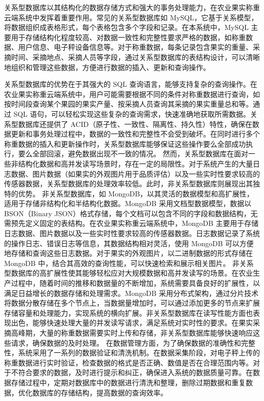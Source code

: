 \documentclass{xduugthesis}
\begin{document}
关系型数据库以其结构化的数据存储方式和强大的事务处理能力，在农业果实称重云端系统中发挥着重要作用。常见的关系型数据库如 MySQL，它基于关系模型，将数据组织成表格形式，每个表格包含多个字段和记录。在本系统中，MySQL 主要用于存储结构化程度较高、对数据一致性和完整性要求严格的数据，如称重数据、用户信息、电子秤设备信息等。对于称重数据，每条记录包含果实的重量、采摘时间、采摘地点、采摘人员等字段，通过关系型数据库的表结构设计，可以清晰地组织和管理这些数据，方便进行数据的插入、更新和查询操作。

关系型数据库的优势在于其强大的 SQL 查询语言，能够支持复杂的查询操作。在农业果实称重云端系统中，用户可能需要根据不同的条件对称重数据进行查询，如按时间段查询某个果园的果实产量、按采摘人员查询其采摘的果实重量总和等。通过 SQL 语句，可以轻松实现这些复杂的查询需求，快速准确地获取所需数据。关系型数据库还提供了 ACID（原子性、一致性、隔离性、持久性）特性，确保在数据更新和事务处理过程中，数据的一致性和完整性不会受到破坏。在同时进行多个称重数据的插入和更新操作时，关系型数据库能够保证这些操作要么全部成功执行，要么全部回滚，避免数据出现不一致的情况。
然而，关系型数据库在面对一些非结构化数据和高并发读写场景时，存在一定的局限性。对于系统产生的大量日志数据、图片数据（如果实的外观图片用于品质评估）以及一些实时性要求较高的传感器数据，关系型数据库的处理效率较低。此时，非关系型数据库则展现出其独特的优势。
非关系型数据库，如 MongoDB，以其灵活的数据模型和高扩展性，适用于存储非结构化和半结构化数据。MongoDB 采用文档型数据模型，数据以 BSON（Binary JSON）格式存储，每个文档可以包含不同的字段和数据结构，无需预先定义固定的表结构。在农业果实称重云端系统中，MongoDB 主要用于存储日志数据、图片数据以及一些实时性要求较高的传感器数据。日志数据记录了系统的操作日志、错误日志等信息，其数据结构相对灵活，使用 MongoDB 可以方便地存储和查询这些日志数据。对于果实的外观图片，以二进制数据的形式存储在 MongoDB 中，结合其高效的查询性能，可以快速检索和展示相关图片。
非关系型数据库的高扩展性使其能够轻松应对大规模数据和高并发读写的场景。在农业生产过程中，随着时间的推移和数据量的不断增加，系统需要具备良好的扩展性，以满足日益增长的数据存储和处理需求。MongoDB 采用分布式架构，通过分片技术将数据分散存储在多个节点上，当数据量增加时，可以通过添加更多的节点来扩展存储容量和处理能力，实现系统的横向扩展。非关系型数据库在读写性能方面也表现出色，能够快速处理大量的并发读写请求，满足系统对实时性的要求。在果实采摘高峰期，大量的称重数据需要实时上传和存储，非关系型数据库能够快速响应这些请求，确保数据的及时处理。
在数据管理方面，为了确保数据的准确性和完整性，系统采用了一系列的数据验证和清洗机制。在数据采集阶段，对电子秤上传的称重数据进行实时验证，检查数据的格式是否正确、数值是否在合理范围内等。对于不符合要求的数据，及时进行提示和纠正，确保进入系统的数据质量可靠。在数据存储过程中，定期对数据库中的数据进行清洗和整理，删除过期数据和重复数据，优化数据库的存储结构，提高数据的查询效率。
\end{document}
